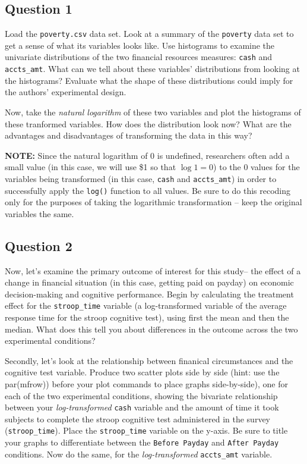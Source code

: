 \documentclass[]{article}
\begin{document}
\subsection{Question 1}\label{question-1}

Load the \texttt{poverty.csv} data set. Look at a summary of the
\texttt{poverty} data set to get a sense of what its variables looks
like. Use histograms to examine the univariate distributions of the two
financial resources measures: \texttt{cash} and \texttt{accts\_amt}.
What can we tell about these variables' distributions from looking at
the histograms? Evaluate what the shape of these distributions could
imply for the authors' experimental design.

Now, take the \emph{natural logarithm} of these two variables and plot
the histograms of these tranformed variables. How does the distribution
look now? What are the advantages and disadvantages of transforming the
data in this way?

\textbf{NOTE:} Since the natural logarithm of 0 is undefined,
researchers often add a small value (in this case, we will use \$1 so
that $\log 1 = 0$) to the 0 values for the variables being transformed
(in this case, \texttt{cash} and \texttt{accts\_amt}) in order to
successfully apply the \texttt{log()} function to all values. Be sure to
do this recoding only for the purposes of taking the logarithmic
transformation -- keep the original variables the same.

\subsection{Question 2}\label{question-2}

Now, let's examine the primary outcome of interest for this study-- the
effect of a change in financial situation (in this case, getting paid on
payday) on economic decision-making and cognitive performance. Begin by
calculating the treatment effect for the \texttt{stroop\_time} variable
(a log-transformed variable of the average response time for the stroop
cognitive test), using first the mean and then the median. What does
this tell you about differences in the outcome across the two
experimental conditions?

Secondly, let's look at the relationship between finanical circumstances
and the cognitive test variable. Produce two scatter plots side by side
(hint: use the par(mfrow)) before your plot commands to place graphs
side-by-side), one for each of the two experimental conditions, showing
the bivariate relationship between your \emph{log-transformed}
\texttt{cash} variable and the amount of time it took subjects to
complete the stroop cognitive test administered in the survey
(\texttt{stroop\_time}). Place the \texttt{stroop\_time} variable on the
y-axis. Be sure to title your graphs to differentiate between the
\texttt{Before Payday} and \texttt{After Payday} conditions. Now do the
same, for the \emph{log-transformed} \texttt{accts\_amt} variable.
\end{document}

